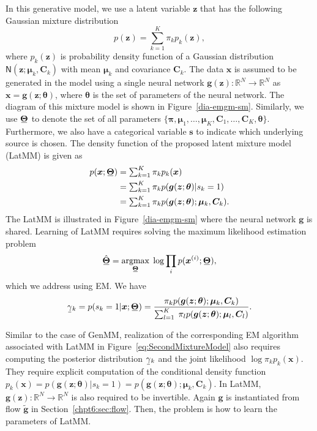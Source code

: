 In this generative model, we use a latent variable $\bm{z}$ that has the following Gaussian mixture distribution
\begin{equation}
  p(\bm{z}) = \sum_{k=1}^K \pi_k p_k(\bm{z}), %
\end{equation}
where $p_k(\bm{z})$ is probability density function of a Gaussian distribution $\mathsf{N}(\bm{z};\bm{\mu}_k,\bm{C}_k)$ with mean $\bm{\mu}_k$ and covariance $\bm{C}_k$.
The data $\bm{x}$ is
assumed to be generated in the model using a single neural network
$\bm{g}(\bm{z}): \mathbb{R}^N \rightarrow \mathbb{R}^N$ as
$\bm{x}=\bm{g}(\bm{z};\bm{\theta})$, where $\bm{\theta}$
is the set of parameters of the neural network. The diagram of this mixture model
is shown in Figure~\ref{dia-emgm-sm}. Similarly, we use $\ubar{\bm{\Theta}}$ to denote the set of all parameters $\{ \bm{\pi},
\bm{\mu}_1,\hdots, \bm{\mu}_K, \bm{C}_1,\hdots,
\bm{C}_K, \bm{\theta} \}$. Furthermore, we also have a categorical variable $\bm{s}$ to indicate which underlying source is chosen. The density function of the proposed latent mixture model (LatMM) is given as
\begin{align}\label{eq:SecondMixtureModel}
  p(\bm{x};\ubar{\bm{\Theta}}) & = \textstyle\sum_{k=1}^K \pi_k p_k(\bm{x}) \nonumber\\
                               &= \textstyle\sum_{k=1}^K \pi_k  p(\bm{g}(\bm{z}; \bm{\theta})| s_k=1) \nonumber \\
                               & = \textstyle\sum_{k=1}^K \pi_k  p(\bm{g}(\bm{z};\bm{\theta}); \bm{\mu}_k, \bm{C}_k).
\end{align}
The LatMM is illustrated in Figure~\ref{dia-emgm-sm} where the neural network $\bm{g}$ is shared. Learning of LatMM requires solving the maximum likelihood estimation problem
\begin{equation}
  \ubar{\hat{\bm{\Theta}}} =    \uargmax{\ubar{\bm{\Theta}}}{} \log \prod_{i} p(\bm{x}^{(i)};\ubar{\bm{\Theta}}),
\end{equation}
which we address using EM.
We have
\begin{align}\label{eq-latMM-gamma}
  \ubar{\gamma}_k = p(s_k =1|\bm{x};\ubar{\bm{\Theta}})  
  = \frac{\pi_k p(\bm{g}(\bm{z};\bm{\theta});\bm{\mu}_k, \bm{C}_k)}{\sum_{l=1}^K\; \pi_l p(\bm{g}(\bm{z};\bm{\theta});\bm{\mu}_l, \bm{C}_l)}.
\end{align}

Similar to the case of GenMM, realization of the corresponding EM
algorithm associated with LatMM in Figure~\ref{eq:SecondMixtureModel}
also requires computing the posterior distribution $\ubar{\gamma}_k$ and the joint likelihood $\log{\pi_k p_k(\bm{x})}$. They require explicit computation of the conditional density function $p_k(\bm{x}) = p(\bm{g}(\bm{z};\bm{\theta})| s_k=1) = p(\bm{g}(\bm{z};\bm{\theta});\bm{\mu}_k, \bm{C}_k) $. In LatMM, $\bm{g}(\bm{z}): \mathbb{R}^N \rightarrow \mathbb{R}^N$ is also required to be invertible. Again $\bm{g}$ is instantiated from flow $\tilde{\bm{g}}$ in Section~\ref{chpt6:sec:flow}. Then, the problem is how to learn the parameters of LatMM.

